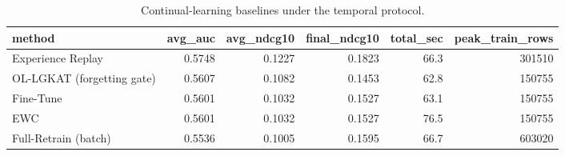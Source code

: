 \begin{table}[t]
\centering
\caption{Continual-learning baselines under the temporal protocol.}
\label{tab:baselines}
\begin{tabular}{lrrrrr}
\toprule
method & avg\_auc & avg\_ndcg10 & final\_ndcg10 & total\_sec & peak\_train\_rows \\
\midrule
Experience Replay & 0.5748 & 0.1227 & 0.1823 & 66.3 & 301510 \\
OL-LGKAT (forgetting gate) & 0.5607 & 0.1082 & 0.1453 & 62.8 & 150755 \\
Fine-Tune & 0.5601 & 0.1032 & 0.1527 & 63.1 & 150755 \\
EWC & 0.5601 & 0.1032 & 0.1527 & 76.5 & 150755 \\
Full-Retrain (batch) & 0.5536 & 0.1005 & 0.1595 & 66.7 & 603020 \\
\bottomrule
\end{tabular}
\end{table}

